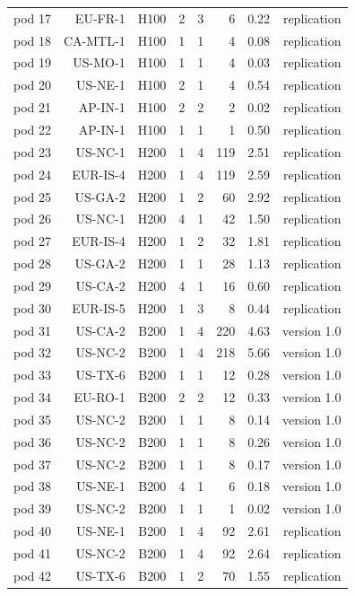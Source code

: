 \begin{longtable}{lrrrrrrr}
pod 17 & EU-FR-1 & H100 & 2 & 3 & 6 & 0.22 & replication \\
pod 18 & CA-MTL-1 & H100 & 1 & 1 & 4 & 0.08 & replication \\
pod 19 & US-MO-1 & H100 & 1 & 1 & 4 & 0.03 & replication \\
pod 20 & US-NE-1 & H100 & 2 & 1 & 4 & 0.54 & replication \\
pod 21 & AP-IN-1 & H100 & 2 & 2 & 2 & 0.02 & replication \\
pod 22 & AP-IN-1 & H100 & 1 & 1 & 1 & 0.50 & replication \\
pod 23 & US-NC-1 & H200 & 1 & 4 & 119 & 2.51 & replication \\
pod 24 & EUR-IS-4 & H200 & 1 & 4 & 119 & 2.59 & replication \\
pod 25 & US-GA-2 & H200 & 1 & 2 & 60 & 2.92 & replication \\
pod 26 & US-NC-1 & H200 & 4 & 1 & 42 & 1.50 & replication \\
pod 27 & EUR-IS-4 & H200 & 1 & 2 & 32 & 1.81 & replication \\
pod 28 & US-GA-2 & H200 & 1 & 1 & 28 & 1.13 & replication \\
pod 29 & US-CA-2 & H200 & 4 & 1 & 16 & 0.60 & replication \\
pod 30 & EUR-IS-5 & H200 & 1 & 3 & 8 & 0.44 & replication \\
pod 31 & US-CA-2 & B200 & 1 & 4 & 220 & 4.63 & version 1.0 \\
pod 32 & US-NC-2 & B200 & 1 & 4 & 218 & 5.66 & version 1.0 \\
pod 33 & US-TX-6 & B200 & 1 & 1 & 12 & 0.28 & version 1.0 \\
pod 34 & EU-RO-1 & B200 & 2 & 2 & 12 & 0.33 & version 1.0 \\
pod 35 & US-NC-2 & B200 & 1 & 1 & 8 & 0.14 & version 1.0 \\
pod 36 & US-NC-2 & B200 & 1 & 1 & 8 & 0.26 & version 1.0 \\
pod 37 & US-NC-2 & B200 & 1 & 1 & 8 & 0.17 & version 1.0 \\
pod 38 & US-NE-1 & B200 & 4 & 1 & 6 & 0.18 & version 1.0 \\
pod 39 & US-NC-2 & B200 & 1 & 1 & 1 & 0.02 & version 1.0 \\
pod 40 & US-NE-1 & B200 & 1 & 4 & 92 & 2.61 & replication \\
pod 41 & US-NC-2 & B200 & 1 & 4 & 92 & 2.64 & replication \\
pod 42 & US-TX-6 & B200 & 1 & 2 & 70 & 1.55 & replication \\

\end{longtable}
